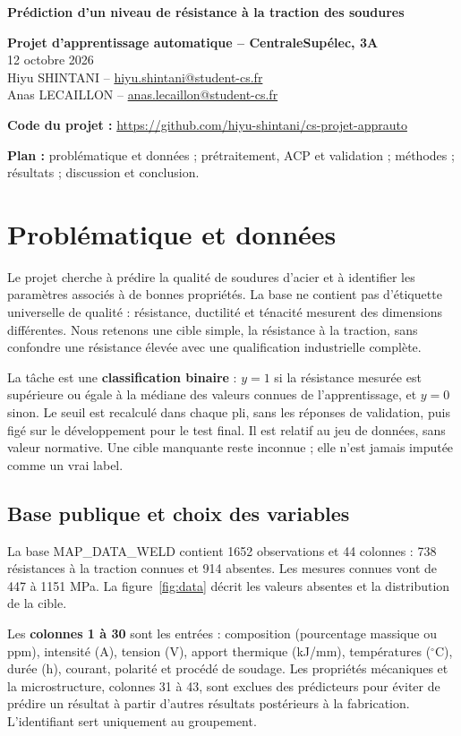 \documentclass[10pt,a4paper]{article}
\makeatletter
\newcommand{\Etudiants}{Hiyu SHINTANI -- \href{mailto:hiyu.shintani@student-cs.fr}{hiyu.shintani@student-cs.fr}\\Anas LECAILLON -- \href{mailto:anas.lecaillon@student-cs.fr}{anas.lecaillon@student-cs.fr}}
\newcommand{\DateRapport}{12 octobre 2026}
\makeatother
\begin{document}
{\Large\bfseries\color{bluecol}Prédiction d'un niveau de résistance à la traction des soudures}\par

\textbf{Projet d'apprentissage automatique -- CentraleSupélec, 3A}\\\DateRapport{}\\\Etudiants{}

\textbf{Code du projet :} \url{https://github.com/hiyu-shintani/cs-projet-apprauto}

\textbf{Plan :} problématique et données ; prétraitement, ACP et validation ; méthodes ; résultats ; discussion et conclusion.

\section{Problématique et données}

Le projet cherche à prédire la qualité de soudures d'acier et à identifier les paramètres associés à de bonnes propriétés. La base ne contient pas d'étiquette universelle de qualité : résistance, ductilité et ténacité mesurent des dimensions différentes. Nous retenons une cible simple, la résistance à la traction, sans confondre une résistance élevée avec une qualification industrielle complète.

La tâche est une \textbf{classification binaire} : $y=1$ si la résistance mesurée est supérieure ou égale à la médiane des valeurs connues de l'apprentissage, et $y=0$ sinon. Le seuil est recalculé dans chaque pli, sans les réponses de validation, puis figé sur le développement pour le test final. Il est relatif au jeu de données, sans valeur normative. Une cible manquante reste inconnue ; elle n'est jamais imputée comme un vrai label.

\subsection{Base publique et choix des variables}

La base MAP\_DATA\_WELD\cite{data} contient 1652 observations et 44 colonnes : 738 résistances à la traction connues et 914 absentes. Les mesures connues vont de 447 à 1151 MPa. La figure~\ref{fig:data} décrit les valeurs absentes et la distribution de la cible.

Les \textbf{colonnes 1 à 30} sont les entrées : composition (pourcentage massique ou ppm), intensité (A), tension (V), apport thermique (kJ/mm), températures (${}^\circ$C), durée (h), courant, polarité et procédé de soudage. Les propriétés mécaniques et la microstructure, colonnes 31 à 43, sont exclues des prédicteurs pour éviter de prédire un résultat à partir d'autres résultats postérieurs à la fabrication. L'identifiant sert uniquement au groupement.
\end{document}
